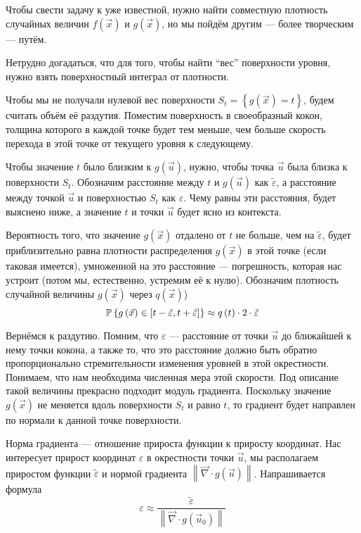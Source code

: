 Чтобы свести задачу к уже известной, нужно найти совместную плотность
случайных величин $f\left( \vec{x} \right)$ и $g\left( \vec{x} \right)$,
но мы пойдём другим --- более творческим --- путём.

Нетрудно догадаться, что для того, чтобы найти ``вес'' поверхности уровня,
нужно взять поверхностный интеграл от плотности.

Чтобы мы не получали нулевой вес поверхности
$S_t = \left\{ g\left( \vec{x} \right) = t \right\}$,
будем считать объём её раздутия.
Поместим поверхность в своеобразный кокон,
толщина которого в каждой точке будет тем меньше,
чем больше скорость перехода в этой точке от текущего уровня к следующему.

Чтобы значение $t$ было близким к $g\left( \vec{u} \right)$,
нужно, чтобы точка $\vec{u}$ была близка к поверхности $S_t$.
Обозначим расстояние между $t$ и $g\left( \vec{u} \right)$
как $\tilde{\varepsilon}$,
а расстояние между точкой $\vec{u}$ и поверхностью $S_t$
как $\varepsilon$. Чему равны эти расстояния, будет выяснено ниже,
а значение $t$ и точки $\vec{u}$ будет ясно из контекста.

Вероятность того, что значение $g\left( \vec{x} \right)$
отдалено от $t$ не больше, чем на $\tilde{\varepsilon}$,
будет приблизительно равна плотности распределения $g\left( \vec{x} \right)$
в этой точке (если таковая имеется),
умноженной на это расстояние --- погрешность,
которая нас устроит (потом мы, естественно, устремим её к нулю).
Обозначим плотность случайной величины $g\left( \vec{x} \right)$
через $q\left( \vec{x} \right)$)
$$\mathbb{P}\left\{ g\left( \vec{x} \right)
    \in \left[t-\tilde{\varepsilon}, t+\tilde{\varepsilon}\right] \right\}
    \approx q\left( t \right) \cdot 2 \cdot \tilde{\varepsilon}$$

Вернёмся к раздутию. Помним, что $\varepsilon$ --- расстояние от
точки $\vec{u}$ до ближайшей к нему точки кокона, а также то,
что это расстояние должно быть обратно пропорционально
стремительности изменения уровней в этой окрестности.
Понимаем, что нам необходима численная мера этой скорости.
Под описание такой величины прекрасно подходит модуль градиента.
Поскольку значение $g\left( \vec{x} \right)$ не меняется вдоль поверхности $S_t$
и равно $t$, то градиент будет направлен по нормали к данной точке поверхности.

Норма градиента --- отношение прироста функции к приросту координат.
Нас интересует прирост координат $\varepsilon$ в окрестности точки $\vec{u}$,
мы располагаем приростом функции $\tilde{\varepsilon}$
и нормой градиента
$\left\| \vec{\nabla} \cdot {g\left( \vec{u} \right)} \right\|$.
Напрашивается формула
$$\varepsilon
    \approx \frac{\tilde{\varepsilon}}
        {\left\| \vec{\nabla} \cdot {g\left( \vec{u}_0 \right)} \right\|}$$
